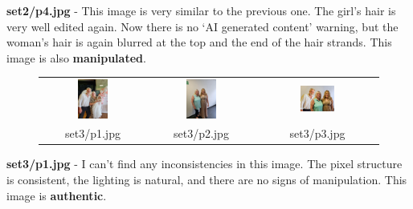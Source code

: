 \documentclass[pdflatex,sn-mathphys-num]{sn-jnl}
\begin{document}
\par \textbf{set2/p4.jpg} \-- This image is very similar to the previous one. The girl's hair is very well edited again.
Now there is no `AI generated content' warning, but the woman's hair is again blurred at the top and the end of the hair
strands. This image is also \textbf{manipulated}.

\begin{figure}[htbp]
    \centering
    \begin{tabular}{ccc}
        \includegraphics[width=0.3\textwidth]{images/set3/p1.jpg} &
        \includegraphics[width=0.3\textwidth]{images/set3/p2.jpg} &
        \includegraphics[width=0.3\textwidth]{images/set3/p3.jpg} \\
        set3/p1.jpg & set3/p2.jpg & set3/p3.jpg
    \end{tabular}
    \label{fig:set3_images}
\end{figure}

\par \textbf{set3/p1.jpg} \-- I can't find any inconsistencies in this image. The pixel structure is consistent, the
lighting is natural, and there are no signs of manipulation. This image is \textbf{authentic}.
\end{document}
